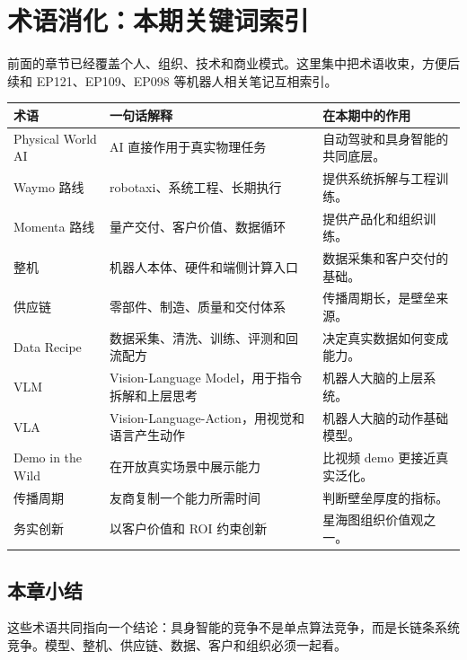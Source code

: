 \section{术语消化：本期关键词索引}

前面的章节已经覆盖个人、组织、技术和商业模式。这里集中把术语收束，方便后续和 EP121、EP109、EP098 等机器人相关笔记互相索引。

\begin{longtable}{p{}p{}p{}}
\toprule
术语 & 一句话解释 & 在本期中的作用 \\
\midrule
Physical World AI & AI 直接作用于真实物理任务 & 自动驾驶和具身智能的共同底层。 \\
Waymo 路线 & robotaxi、系统工程、长期执行 & 提供系统拆解与工程训练。 \\
Momenta 路线 & 量产交付、客户价值、数据循环 & 提供产品化和组织训练。 \\
整机 & 机器人本体、硬件和端侧计算入口 & 数据采集和客户交付的基础。 \\
供应链 & 零部件、制造、质量和交付体系 & 传播周期长，是壁垒来源。 \\
Data Recipe & 数据采集、清洗、训练、评测和回流配方 & 决定真实数据如何变成能力。 \\
VLM & Vision-Language Model，用于指令拆解和上层思考 & 机器人大脑的上层系统。 \\
VLA & Vision-Language-Action，用视觉和语言产生动作 & 机器人大脑的动作基础模型。 \\
Demo in the Wild & 在开放真实场景中展示能力 & 比视频 demo 更接近真实泛化。 \\
传播周期 & 友商复制一个能力所需时间 & 判断壁垒厚度的指标。 \\
务实创新 & 以客户价值和 ROI 约束创新 & 星海图组织价值观之一。 \\
\bottomrule
\end{longtable}

\subsection{本章小结}

这些术语共同指向一个结论：具身智能的竞争不是单点算法竞争，而是长链条系统竞争。模型、整机、供应链、数据、客户和组织必须一起看。

